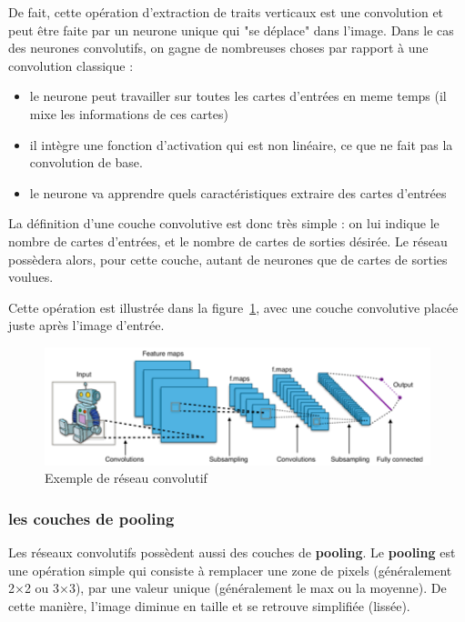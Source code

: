 De fait, cette opération d'extraction de traits verticaux est une convolution
et peut être faite par un neurone unique qui "se déplace" dans l'image.
Dans le cas des neurones convolutifs, on gagne de nombreuses choses par rapport
à une convolution classique :
\begin{itemize}
\item le neurone peut travailler sur toutes les cartes d'entrées en meme temps
(il mixe les informations de ces cartes)
\item il intègre une fonction d'activation qui est non linéaire, ce que ne fait
pas la convolution de base.
\item le neurone va apprendre quels caractéristiques extraire des cartes
d'entrées
\end{itemize}

La définition d'une couche convolutive est donc très simple :
on lui indique le nombre de cartes d'entrées, et le nombre de cartes de sorties
désirée. Le réseau possèdera alors, pour cette couche, autant de neurones
que de cartes de sorties voulues.

Cette opération est illustrée dans la figure~\ref{fig:exCNN}, avec une couche
convolutive placée juste après l'image d'entrée.

\begin{figure}[h!]
\centering
\includegraphics[width=16cm]{./images/exCNN.png}
\caption[Exemple de réseau convolutif]{ Exemple de réseau convolutif
\label{fig:exCNN}
}
\end{figure}

\subsubsection{les couches de pooling}

Les réseaux convolutifs possèdent aussi des couches de \textbf{pooling}.
Le \textbf{pooling} est une opération simple qui consiste à remplacer une zone
de pixels (généralement 2×2 ou 3×3), par une valeur unique
(généralement le max ou la moyenne).
De cette manière, l’image diminue en taille et se retrouve simplifiée (lissée).

